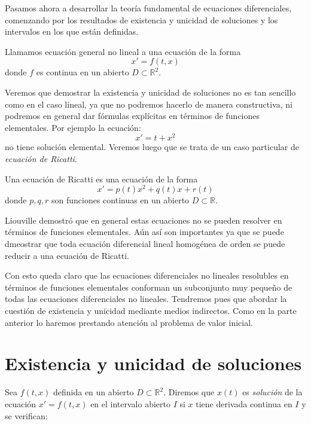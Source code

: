 \documentclass[../ecuaciones_diferenciales.tex]{subfiles}
\begin{document}
Pasamos ahora a desarrollar la teoría fundamental de ecuaciones diferenciales,
comenzando por los resultados de existencia y unicidad de soluciones y los intervalos en
los que están definidas.

\begin{definition}
    Llamamos ecuación general no lineal a una ecuación de la forma 
    \[x' = f(t, x)\]
    donde \(f\) es continua en un abierto \(D \subset \mathbb{R}^2\).
\end{definition}

Veremos que demostrar la existencia y unicidad de soluciones no es tan sencillo como en el caso lineal, ya
que no podremos hacerlo de manera constructiva, ni podremos en general dar fórmulas explícitas en términos
de funciones elementales. Por ejemplo la ecuación:
\[x' = t + x^2\]
no tiene solución elemental. Veremos luego que se trata de un caso particular de \emph{ecuación de Ricatti}.

\begin{definition}
    Una ecuación de Ricatti es una ecuación de la forma
    \[x' = p(t)x^2 + q(t)x + r(t)\]
    donde \(p, q, r\) son funciones continuas en un abierto \(D \subset \mathbb{R}\).
\end{definition}

Liouville demostró que en general estas ecuaciones no se pueden resolver en términos de funciones elementales.
Aún así son importantes ya que se puede dmeostrar que toda ecuación diferencial lineal homogénea de orden se 
puede reducir a una ecuación de Ricatti.

Con esto queda claro que las ecuaciones diferenciales no lineales resolubles en términos de funciones elementales
conforman un subconjunto muy pequeño de todas las ecuaciones diferenciales no lineales. Tendremos pues que 
abordar la cuestión de existencia y unicidad mediante medios indirectos. Como en la parte anterior lo haremos
prestando atención al problema de valor inicial.

\section{Existencia y unicidad de soluciones}

Sea \(f(t, x)\) definida en un abierto \(D \subset \mathbb{R}^2\). Diremos que \(x(t)\) es \emph{solución} de la
ecuación \(x' = f(t, x)\) en el intervalo abierto \(I\) si \(x\) tiene derivada continua en \(I\) y se verifican:
\end{document}
